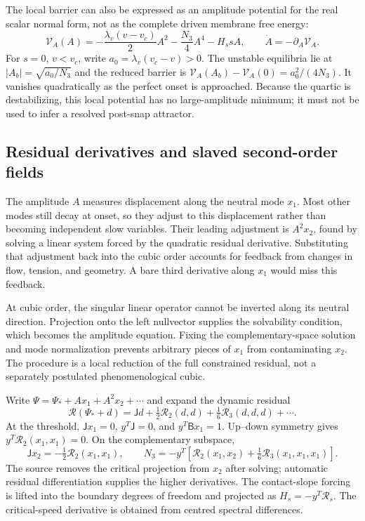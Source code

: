 The local barrier can also be expressed as an amplitude potential for the real scalar normal form, not as the complete driven membrane free energy:
\begin{equation}
\mathcal V_A(A)=-\frac{\lambda_v(v-v_c)}{2}A^2
-\frac{N_3}{4}A^4-H_s sA,\qquad \dot A=-\partial_A\mathcal V_A.
\label{eq:amplitude-potential}
\end{equation}
For $s=0$, $v<v_c$, write $a_0=\lambda_v(v_c-v)>0$. The unstable equilibria lie at $|A_b|=\sqrt{a_0/N_3}$ and the reduced barrier is $\mathcal V_A(A_b)-\mathcal V_A(0)=a_0^2/(4N_3)$. It vanishes quadratically as the perfect onset is approached. Because the quartic is destabilizing, this local potential has no large-amplitude minimum; it must not be used to infer a resolved post-snap attractor.

\subsection{Residual derivatives and slaved second-order fields}


The amplitude $A$ measures displacement along the neutral mode $x_1$. Most other modes still decay at onset, so they adjust to this displacement rather than becoming independent slow variables. Their leading adjustment is $A^2x_2$, found by solving a linear system forced by the quadratic residual derivative. Substituting that adjustment back into the cubic order accounts for feedback from changes in flow, tension, and geometry. A bare third derivative along $x_1$ would miss this feedback.

At cubic order, the singular linear operator cannot be inverted along its neutral direction. Projection onto the left nullvector supplies the solvability condition, which becomes the amplitude equation. Fixing the complementary-space solution and mode normalization prevents arbitrary pieces of $x_1$ from contaminating $x_2$. The procedure is a local reduction of the full constrained residual, not a separately postulated phenomenological cubic.


Write $\Psi=\Psi_*+Ax_1+A^2x_2+\cdots$ and expand the dynamic residual
\begin{equation}
\mathcal R(\Psi_*+d)=\mathsf Jd+\tfrac12\mathcal R_2(d,d)+\tfrac16\mathcal R_3(d,d,d)+\cdots .
\end{equation}
At the threshold, $\mathsf Jx_1=0$, $y^T\mathsf J=0$, and $y^T\mathsf Bx_1=1$. Up--down symmetry gives $y^T\mathcal R_2(x_1,x_1)=0$. On the complementary subspace,
\begin{equation}
\mathsf Jx_2=-\tfrac12\mathcal R_2(x_1,x_1),\qquad
N_3=-y^T\left[\mathcal R_2(x_1,x_2)+\tfrac16\mathcal R_3(x_1,x_1,x_1)\right].
\end{equation}
The source removes the critical projection from $x_2$ after solving; automatic residual differentiation supplies the higher derivatives. The contact-slope forcing is lifted into the boundary degrees of freedom and projected as $H_s=-y^T\mathcal R_s$. The critical-speed derivative is obtained from centred spectral differences.

